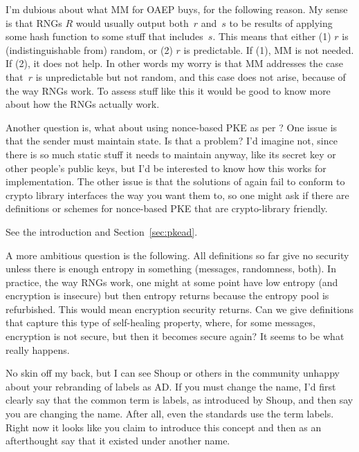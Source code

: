 \begin{displayquote}
  I'm dubious about what MM for OAEP buys, for the following reason. My sense is
  that RNGs $R$ would usually output both~$r$ and~$s$ to be results of applying some
  hash function to some stuff that includes~$s$. This means that either (1) $r$ is
  (indistinguishable from) random, or (2) $r$ is predictable. If (1), MM is not
  needed. If (2), it does not help. In other words my worry is that MM addresses
  the case that~$r$ is unpredictable but not random, and this case does not arise,
  because of the way RNGs work. To assess stuff like this it would be good to
  know more about how the RNGs actually work.
\end{displayquote}
%

\begin{displayquote}
  Another question is, what about using nonce-based PKE as per
  \cite{bellare2016nonce}? One issue is that the sender must maintain state. Is
  that a problem? I'd imagine not, since there is so much static stuff it needs
  to maintain anyway, like its secret key or other people's public keys, but I'd
  be interested to know how this works for implementation. The other issue is
  that the solutions of \cite{bellare2016nonce} again fail to conform to crypto
  library interfaces the way you want them to, so one might ask if there are
  definitions or schemes for nonce-based PKE that are crypto-library friendly.
\end{displayquote}
%
\cpnote{}
See the introduction and Section~\ref{sec:pkead}.

\begin{displayquote}
  A more ambitious question is the following. All definitions so far give no
  security unless there is enough entropy in something (messages, randomness,
  both). In practice, the way RNGs work, one might at some point have low
  entropy (and encryption is insecure) but then entropy returns because the
  entropy pool is refurbished. This would mean encryption security returns. Can
  we give definitions that capture this type of self-healing property, where,
  for some messages, encryption is not secure, but then it becomes secure again?
  It seems to be what really happens.
\end{displayquote}
%

\begin{displayquote}
  No skin off my back, but I can see Shoup or others in the community unhappy
  about your rebranding of labels as AD. If you must change the name, I'd first
  clearly say that the common term is labels, as introduced by Shoup, and then
  say you are changing the name. After all, even the standards use the term
  labels.  Right now it looks like you claim to introduce this concept and then
  as an afterthought say that it existed under another name.
\end{displayquote}
